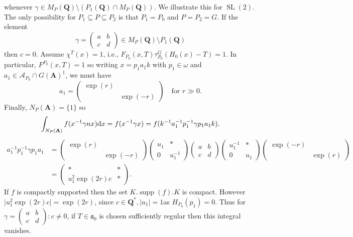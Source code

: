 \documentclass[11pt]{amsart}
\def\A{\mathbf A}
\def\Q{\mathbf Q}
\def\AAA{\mathcal A}	%
\def\aaa{\mathfrak a}
\def\cb#1{{\color{black}#1}}
\def\d{\text d}
\def\bs{\setminus} 			%
\def\mod#1{\lvert #1 \rvert} %
\def\se{\subseteq}
\def\sl{\operatorname{SL}}
\theoremstyle{remark}
\begin{document}
whenever $\gamma \in M_P(\Q) \bs (P_1(\Q) \cap M_P(\Q))$. \cb{We illustrate this for $\sl(2)$. 
The only possibility for $P_1 \se P \se P_2$ is that $P_1 = P_0$ and $P = P_2 = G$. If the element 
\[ \gamma = \begin{pmatrix} a & b \\ c & d \end{pmatrix} \in M_P(\Q) \bs P_1(\Q) \]
then $c = 0$. Assume $\chi^T(x) = 1$, i.e., $F_{P_0}(x, T) \tau_{P_0}^G (H_0(x) - T) = 1$. In particular, $F^{P_0}(x, T) = 1$ so writing $x = p_1 a_1 k$ with $p_1 \in \omega$ and $a_1 \in \AAA_{P_0} \cap G(\A)^1$, we must have 
\[ a_1 = \begin{pmatrix} \exp(r) & \\ & \exp(-r) \end{pmatrix} \quad \text{for } r \gg 0. \]
Finally, $N_P(\A) = \{1 \}$ so
\[ \int_{N_P(\A)} f(x^{-1}\gamma n x) \d x = f(x^{-1}\gamma x) = f(k^{-1}a_1^{-1}p_1^{-1} \gamma p_1 a_1 k). \]
\begin{align*}
	a_1^{-1}p_1^{-1} \gamma p_1 a_1 & = \begin{pmatrix}	\exp(r) & \\ & \exp(-r) \end{pmatrix} 
			\begin{pmatrix} u_1 & * \\ 0 & u_1^{-1}	\end{pmatrix} \begin{pmatrix} a & b \\ c & d \end{pmatrix}
			\begin{pmatrix} u_1^{-1} & * \\ 0 & u_1	\end{pmatrix} \begin{pmatrix} \exp(-r) & \\ & \exp(r)\end{pmatrix} \\
			& = \begin{pmatrix}	* & * \\ u_1^2 \exp(2r) c & * \end{pmatrix}.
\end{align*}
If $f$ is compactly supported then the set $K.\operatorname{supp}(f).K$ is compact. However $\mod{u_1^2 \exp(2r) c} = \exp(2r)$, since $c \in \Q^*, \mod{u_1} = 1 $as $H_{P_0}(p_1) = 0$. Thus for $\gamma = \begin{pmatrix} a & b \\ c & d \end{pmatrix} : c \neq 0$, if $T \in \aaa_0$ is chosen sufficiently regular then this integral vanishes. 
}
\end{document}
